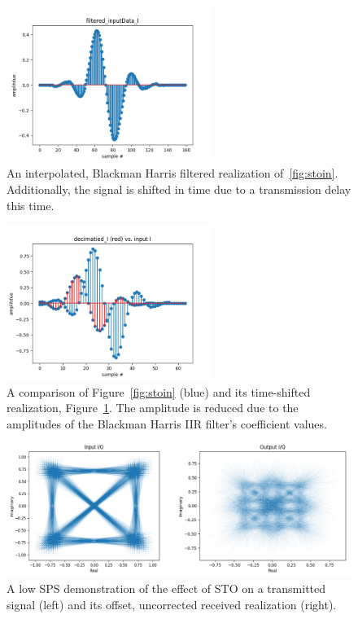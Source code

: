 \FloatBarrier
\begin{figure}[ht!]
	\centering	\includegraphics[width=0.6\textwidth,keepaspectratio]{figs/email_ifilt.png}
    \caption{An interpolated, Blackman Harris filtered realization of~\ref{fig:stoin}. Additionally, the signal is shifted in time due to a transmission delay this time.} 
\label{fig:stoshift}      
\end{figure}
\FloatBarrier

\FloatBarrier
\begin{figure}[ht!]
	\centering	\includegraphics[width=0.6\textwidth,keepaspectratio]{figs/email_comparison.png}
    \caption{A comparison of Figure~\ref{fig:stoin} (blue) and its time-shifted realization, Figure~\ref{fig:stoshift}. The amplitude is reduced due to the amplitudes of the Blackman Harris IIR filter's coefficient values.} 
\label{fig:stocomp}      
\end{figure}
\FloatBarrier

\FloatBarrier
\begin{figure}[ht!]
	\centering	\includegraphics[width=1\textwidth,keepaspectratio]{figs/stoiq.png}
    \caption{A low SPS demonstration of the effect of STO on a transmitted signal (left) and its offset, uncorrected received realization (right).} 
\label{fig:stoiq}      
\end{figure}
\FloatBarrier

